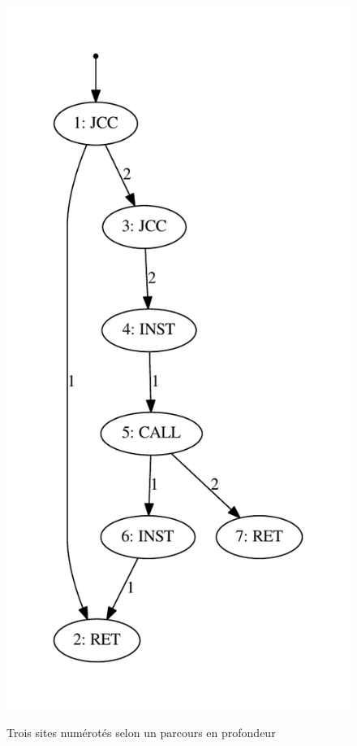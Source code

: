 \begin{figure}[h]
\begin{center}
{\includegraphics[height=0.4\textheight]{supports/algos/g3prof.pdf}}
\end{center}
\caption{Trois sites numérotés selon un parcours en profondeur}
\label{fig:troisProf}
\end{figure}


